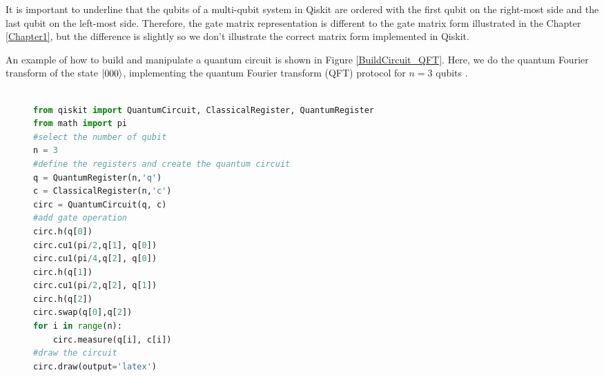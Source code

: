 It is important to underline that the qubits of a multi-qubit system in Qiskit are ordered with the first qubit on the right-most side and the last qubit on the left-most side. Therefore, the gate matrix representation is different to the gate matrix form illustrated in the Chapter \ref{Chapter1}, but the difference is slightly so we don't illustrate the correct matrix form implemented in Qiskit.

An example of how to build and manipulate a quantum circuit is shown in Figure \ref{BuildCircuit_QFT}. Here, we do the quantum Fourier transform of the state $\left| 000 \right \rangle$, implementing the quantum Fourier transform (QFT) protocol for $n=3$ qubits \cite{Nielsen}.


\begin{figure}[h!]
\begin{lstlisting}[language=Python]%[language=Python, caption=Python example]

from qiskit import QuantumCircuit, ClassicalRegister, QuantumRegister
from math import pi
#select the number of qubit
n = 3 
#define the registers and create the quantum circuit
q = QuantumRegister(n,'q')  
c = ClassicalRegister(n,'c') 
circ = QuantumCircuit(q, c)
#add gate operation
circ.h(q[0])
circ.cu1(pi/2,q[1], q[0])
circ.cu1(pi/4,q[2], q[0])
circ.h(q[1])
circ.cu1(pi/2,q[2], q[1])
circ.h(q[2])
circ.swap(q[0],q[2])
for i in range(n):
    circ.measure(q[i], c[i])
#draw the circuit
circ.draw(output='latex')
 
\end{lstlisting}


\end{figure}
